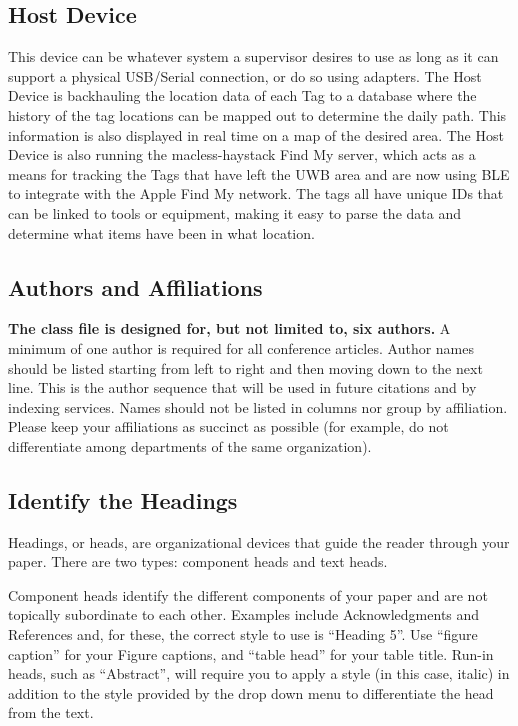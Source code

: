 \documentclass[conference]{IEEEtran}
\begin{document}
\subsection{Host Device}

This device can be whatever system a supervisor desires to use as long as it can support a physical USB/Serial connection, or do so using adapters. The Host Device is backhauling the location data of each Tag to a database where the history of the tag locations can be mapped out to determine the daily path. This information is also displayed in real time on a map of the desired area. The Host Device is also running the macless-haystack Find My server, which acts as a means for tracking the Tags that have left the UWB area and are now using BLE to integrate with the Apple Find My network. The tags all have unique IDs that can be linked to tools or equipment, making it easy to parse the data and determine what items have been in what location. 



\subsection{Authors and Affiliations}
\textbf{The class file is designed for, but not limited to, six authors.} A 
minimum of one author is required for all conference articles. Author names 
should be listed starting from left to right and then moving down to the 
next line. This is the author sequence that will be used in future citations 
and by indexing services. Names should not be listed in columns nor group by 
affiliation. Please keep your affiliations as succinct as possible (for 
example, do not differentiate among departments of the same organization).

\subsection{Identify the Headings}
Headings, or heads, are organizational devices that guide the reader through 
your paper. There are two types: component heads and text heads.

Component heads identify the different components of your paper and are not 
topically subordinate to each other. Examples include Acknowledgments and 
References and, for these, the correct style to use is ``Heading 5''. Use 
``figure caption'' for your Figure captions, and ``table head'' for your 
table title. Run-in heads, such as ``Abstract'', will require you to apply a 
style (in this case, italic) in addition to the style provided by the drop 
down menu to differentiate the head from the text.
\end{document}
